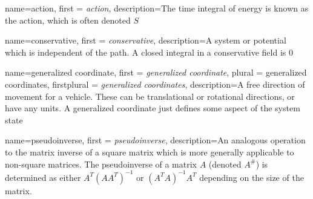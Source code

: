 {
    name=action,
    first = {\textit{action}},
    description={The time integral of energy is known as the action, which is often denoted $S$}
}

{
    name=conservative,
    first = {\textit{conservative}},
    description={A system or potential which is independent of the path. A closed integral in a conservative field is 0}
}

{
    name=generalized coordinate,
    first = {\textit{generalized coordinate}},
    plural = {generalized coordinates},
    firstplural = {\textit{generalized coordinates}},
    description={A free direction of movement for a vehicle. These can be translational or rotational directions, or have any units. A generalized coordinate just defines some aspect of the system state}
}

{
    name=pseudoinverse,
    first = {\textit{pseudoinverse}},
    description={An analogous operation to the matrix inverse of a square matrix which is more generally applicable to non-square matrices. The pseudoinverse of a matrix $A$ (denoted $A^\#$) is determined as either $A^T(AA^T)^{-1}$ or $(A^TA)^{-1}A^T$ depending on the size of the matrix.}
}




